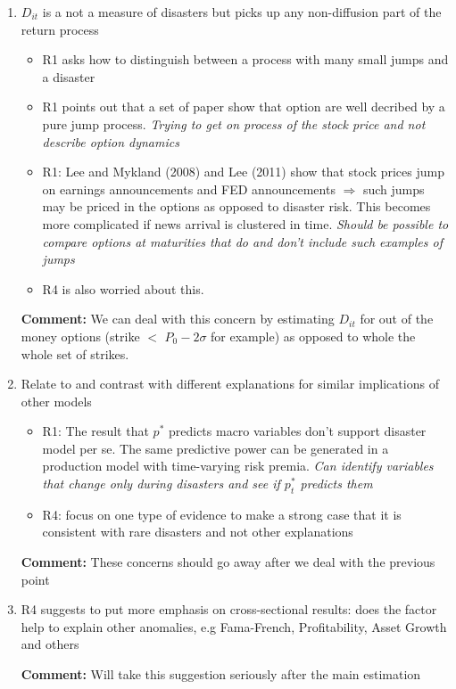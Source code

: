 \documentclass[11pt]{article}
\title{}
\author{}
\date{\today}
\begin{document}
\begin{enumerate}
	\item $D_{it}$ is a not a measure of disasters but picks up any non-diffusion part of the return process
	\begin{itemize}
		\item R1 asks how to distinguish between a process with many small jumps and a disaster
		\item R1 points out that a set of paper show that option are well decribed by a pure jump process. \textit{Trying to get on process of the stock price and not describe option dynamics}
		\item R1: Lee and Mykland (2008) and Lee (2011) show that stock prices jump on earnings announcements and FED announcements $\Rightarrow$ such jumps may be priced in the options as opposed to disaster risk. This becomes more complicated if news arrival is clustered in time. \textit{Should be possible to compare options at maturities that do and don't include such examples of jumps}
		\item R4 is also worried about this.
	\end{itemize}
	\textbf{Comment:} We can deal with this concern by estimating $D_{it}$ for out of the money options (strike $<$ $P_0 - 2\sigma$ for example) as opposed to whole the whole set of strikes.

	\item Relate to and contrast with different explanations for similar implications of other models
	\begin{itemize}
		\item R1: The result that $p^*$ predicts macro variables don't support disaster model per se. The same predictive power can be generated in a production model with time-varying risk premia. \textit{Can identify variables that change only during disasters and see if $p_t^*$ predicts them}
		\item R4: focus on one type of evidence to make a strong case that it is consistent with rare disasters and not other explanations
	\end{itemize}

	\textbf{Comment:} These concerns should go away after we deal with the previous point

	\item R4 suggests to put more emphasis on cross-sectional results: does the factor help to explain other anomalies, e.g Fama-French, Profitability, Asset Growth and others

	\textbf{Comment:} Will take this suggestion seriously after the main estimation


\end{enumerate}
\end{document}
